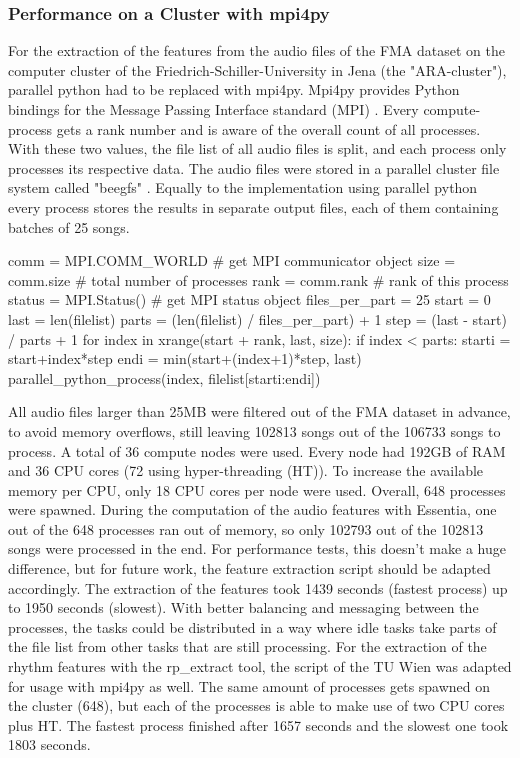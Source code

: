 \subsubsection{Performance on a Cluster with mpi4py}\label{mpi4py}

For the extraction of the features from the audio files of the FMA dataset on the computer cluster of the Friedrich-Schiller-University in Jena (the "ARA-cluster"), parallel python had to be replaced with mpi4py. 
Mpi4py provides Python bindings for the Message Passing Interface standard (MPI) \cite{mpi4py}. 
Every compute-process gets a rank number and is aware of the overall count of all processes. With these two values, the file list of all audio files is split, and each process only processes its respective data. The audio files were stored in a parallel cluster file system called "beegfs" \cite{beegfs}. Equally to the implementation using parallel python every process stores the results in separate output files, each of them containing batches of 25 songs.\\

\begin{pythonCode}[frame=single,label={lst:mpi4py},caption={mpi4py},captionpos=b]
comm = MPI.COMM_WORLD   # get MPI communicator object
size = comm.size        # total number of processes
rank = comm.rank        # rank of this process
status = MPI.Status()   # get MPI status object
files_per_part = 25
start = 0
last = len(filelist)
parts = (len(filelist) / files_per_part) + 1
step = (last - start) / parts + 1
for index in xrange(start + rank, last, size):
    if index < parts:        
        starti = start+index*step
        endi = min(start+(index+1)*step, last)
        parallel_python_process(index, filelist[starti:endi])
\end{pythonCode}

\noindent All audio files larger than 25MB were filtered out of the FMA dataset in advance, to avoid memory overflows, still leaving 102813 songs out of the 106733 songs to process. A total of 36 compute nodes were used. Every node had 192GB of RAM and 36 CPU cores (72 using hyper-threading (HT)). To increase the available memory per CPU, only 18 CPU cores per node were used. Overall, 648 processes were spawned. During the computation of the audio features with Essentia, one out of the 648 processes ran out of memory, so only 102793 out of the 102813 songs were processed in the end. For performance tests, this doesn't make a huge difference, but for future work, the feature extraction script should be adapted accordingly. 
The extraction of the features took 1439 seconds (fastest process) up to 1950 seconds (slowest). With better balancing and messaging between the processes, the tasks could be distributed in a way where idle tasks take parts of the file list from other tasks that are still processing. 
\noindent For the extraction of the rhythm features with the rp\_extract tool, the script of the TU Wien was adapted for usage with mpi4py as well. The same amount of processes gets spawned on the cluster (648), but each of the processes is able to make use of two CPU cores plus HT. The fastest process finished after 1657 seconds and the slowest one took 1803 seconds.

